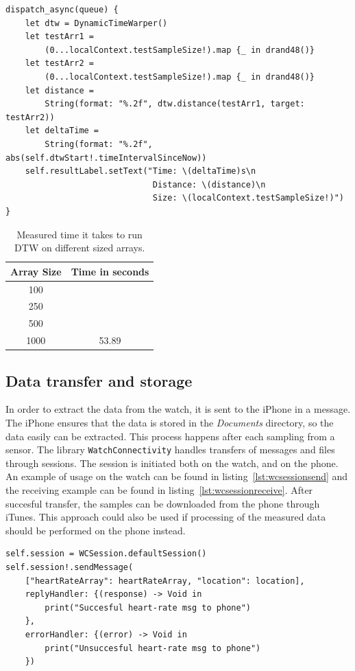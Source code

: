 \begin{lstlisting}[label={lst:dtw},caption={Testing of the implemented DTW
    algorithm, within the DynamicTimeWarpInterfaceController},basicstyle=\small]
dispatch_async(queue) {
    let dtw = DynamicTimeWarper()
    let testArr1 = 
        (0...localContext.testSampleSize!).map {_ in drand48()}
    let testArr2 = 
        (0...localContext.testSampleSize!).map {_ in drand48()}
    let distance = 
        String(format: "%.2f", dtw.distance(testArr1, target: testArr2))
    let deltaTime = 
        String(format: "%.2f", abs(self.dtwStart!.timeIntervalSinceNow))
    self.resultLabel.setText("Time: \(deltaTime)s\n
                              Distance: \(distance)\n
                              Size: \(localContext.testSampleSize!)")
}
\end{lstlisting}

\begin{table}[!h]
\caption{Measured time it takes to run DTW on different sized arrays.}
\label{tbl:rec}
\centering
\begin{tabular}{ |c|c|  }
\hline
Array Size  & Time in seconds\\
\hline
100    &        \\
250    &        \\
500    &        \\
1000   & 53.89  \\
\hline
\end{tabular}
\end{table}

\subsection{Data transfer and storage}
In order to extract the data from the watch, it is sent to the iPhone in a
message. The iPhone ensures that the data is stored in the \textit{Documents}
directory, so the data easily can be extracted. This process happens after each
sampling from a sensor. The library \texttt{WatchConnectivity} handles transfers
of messages and files through sessions. The session is initiated both on the
watch, and on the phone. An example of usage on the watch can be found in 
listing~\ref{lst:wcsessionsend} and the receiving example can be found in 
listing~\ref{lst:wcsessionreceive}.
After succesful transfer, the samples can be downloaded from the phone through
iTunes.
This approach could also be used if processing of the measured data should be
performed on the phone instead.

\begin{lstlisting}[label={lst:wcsessionsend},caption={Send heart rate data to the
phone from the watch.},basicstyle=\small]
self.session = WCSession.defaultSession()
self.session!.sendMessage(
    ["heartRateArray": heartRateArray, "location": location],
    replyHandler: {(response) -> Void in
        print("Succesful heart-rate msg to phone")
    },
    errorHandler: {(error) -> Void in
        print("Unsuccesful heart-rate msg to phone")
    })
\end{lstlisting}

